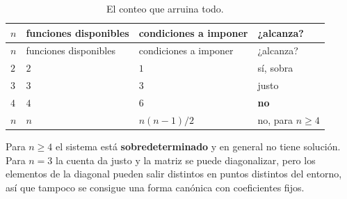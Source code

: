 \documentclass[
  spanish,
  a4paper,
]{scrbook}
\theoremstyle{definition}
\theoremstyle{plain}
\theoremstyle{definition}
\theoremstyle{plain}
\theoremstyle{definition}
\theoremstyle{remark}
\begin{document}
\begin{longtable}[]{@{}
  >{\centering\arraybackslash}p{}
  >{\centering\arraybackslash}p{}
  >{\centering\arraybackslash}p{}
  >{\raggedright\arraybackslash}p{}@{}}
\caption{El conteo que arruina todo.}\label{tbl-conteo}\tabularnewline
\toprule\noalign{}
\begin{minipage}[b]{\linewidth}\centering
\(n\)
\end{minipage} & \begin{minipage}[b]{\linewidth}\centering
funciones disponibles
\end{minipage} & \begin{minipage}[b]{\linewidth}\centering
condiciones a imponer
\end{minipage} & \begin{minipage}[b]{\linewidth}\raggedright
¿alcanza?
\end{minipage} \\
\midrule\noalign{}
\endfirsthead
\toprule\noalign{}
\begin{minipage}[b]{\linewidth}\centering
\(n\)
\end{minipage} & \begin{minipage}[b]{\linewidth}\centering
funciones disponibles
\end{minipage} & \begin{minipage}[b]{\linewidth}\centering
condiciones a imponer
\end{minipage} & \begin{minipage}[b]{\linewidth}\raggedright
¿alcanza?
\end{minipage} \\
\midrule\noalign{}
\endhead
\bottomrule\noalign{}
\endlastfoot
\(2\) & \(2\) & \(1\) & sí, sobra \\
\(3\) & \(3\) & \(3\) & justo \\
\(4\) & \(4\) & \(6\) & \textbf{no} \\
\(n\) & \(n\) & \(n(n-1)/2\) & no, para \(n \ge 4\) \\
\end{longtable}

Para \(n \ge 4\) el sistema está \textbf{sobredeterminado} y en general
no tiene solución. Para \(n=3\) la cuenta da justo y la matriz se puede
diagonalizar, pero los elementos de la diagonal pueden salir distintos
en puntos distintos del entorno, así que tampoco se consigue una forma
canónica con coeficientes fijos.
\end{document}
